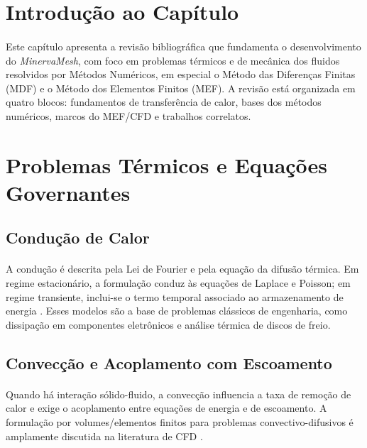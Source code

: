 \section{Introdução ao Capítulo}
\label{sec:revbiblio_intro}

\paragraph{}Este capítulo apresenta a revisão bibliográfica que fundamenta o desenvolvimento do \textit{MinervaMesh}, com foco em problemas térmicos e de mecânica dos fluidos resolvidos por Métodos Numéricos, em especial o Método das Diferenças Finitas (MDF) e o Método dos Elementos Finitos (MEF). A revisão está organizada em quatro blocos: fundamentos de transferência de calor, bases dos métodos numéricos, marcos do MEF/CFD e trabalhos correlatos.

\section{Problemas Térmicos e Equações Governantes}

\subsection{Condução de Calor}
\paragraph{}A condução é descrita pela Lei de Fourier e pela equação da difusão térmica. Em regime estacionário, a formulação conduz às equações de Laplace e Poisson; em regime transiente, inclui-se o termo temporal associado ao armazenamento de energia \cite{Incropera2008,Ozisik1993,Cengel2015,Bejan1992}. Esses modelos são a base de problemas clássicos de engenharia, como dissipação em componentes eletrônicos e análise térmica de discos de freio.

\subsection{Convecção e Acoplamento com Escoamento}
\paragraph{}Quando há interação sólido-fluido, a convecção influencia a taxa de remoção de calor e exige o acoplamento entre equações de energia e de escoamento. A formulação por volumes/elementos finitos para problemas convectivo-difusivos é amplamente discutida na literatura de CFD \cite{Maliska2004,Versteeg2007,Fox2010,White2006,Bird2002}.

